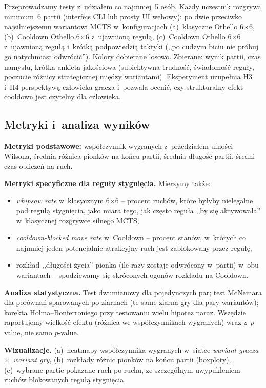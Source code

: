 \documentclass[11pt,a4paper]{article}
\begin{document}
Przeprowadzamy testy z~udziałem co najmniej~5 osób. Każdy uczestnik rozgrywa minimum~6 partii (interfejs CLI lub prosty UI webowy): po dwie przeciwko najsilniejszemu wariantowi MCTS w~konfiguracjach (a)~klasyczne Othello 6$\times$6, (b)~Cooldown Othello 6$\times$6 z~ujawnioną regułą, (c)~Cooldown Othello 6$\times$6 z~ujawnioną regułą i~krótką podpowiedzią taktyki (,,po cudzym biciu nie próbuj go natychmiast odwrócić''). Kolory dobierane losowo. Zbierane: wynik partii, czas namysłu, krótka ankieta jakościowa (subiektywna trudność, świadomość reguły, poczucie różnicy strategicznej między wariantami). Eksperyment uzupełnia H3 i~H4 perspektywą człowieka-gracza i~pozwala ocenić, czy strukturalny efekt cooldown jest czytelny dla człowieka.

\subsection{Metryki i~analiza wyników}

\textbf{Metryki podstawowe:} współczynnik wygranych z~przedziałem ufności Wilsona, średnia różnica pionków na końcu partii, średnia długość partii, średni czas obliczeń na ruch.

\textbf{Metryki specyficzne dla reguły stygnięcia.} Mierzymy także:
\begin{itemize}[leftmargin=1.5em,itemsep=2pt]
    \item \emph{whipsaw rate} w~klasycznym 6$\times$6 -- procent ruchów, które byłyby nielegalne pod regułą stygnięcia, jako miara tego, jak często reguła ,,by się aktywowała'' w~klasycznej rozgrywce silnego MCTS,
    \item \emph{cooldown-blocked move rate} w~Cooldown -- procent stanów, w~których co najmniej jeden potencjalnie atrakcyjny ruch jest zablokowany przez regułę,
    \item rozkład ,,długości życia'' pionka (ile razy zostaje odwrócony w~partii) w~obu wariantach -- spodziewamy się skróconych ogonów rozkładu na Cooldown.
\end{itemize}

\textbf{Analiza statystyczna.} Test dwumianowy dla pojedynczych par; test McNemara dla porównań sparowanych po ziarnach (te same ziarna gry dla pary wariantów); korekta Holma--Bonferroniego przy testowaniu wielu hipotez naraz. Wszędzie raportujemy wielkość efektu (różnica we współczynnikach wygranych) wraz z~$p$-value, nie samo $p$-value.

\textbf{Wizualizacje.} (a)~heatmapy współczynnika wygranych w~siatce \emph{wariant gracza}~$\times$~\emph{wariant gry}, (b)~rozkłady różnic pionków na końcu partii (boxploty), (c)~wybrane partie pokazane ruch po ruchu, ze szczególnym uwypukleniem ruchów blokowanych regułą stygnięcia.
\end{document}
